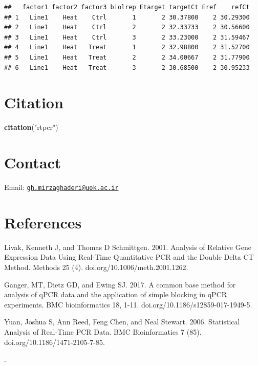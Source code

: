 \documentclass[
]{article}
\newenvironment{Shaded}{\begin{snugshade}}{\end{snugshade}}
\newcommand{\FunctionTok}[1]{\textcolor[rgb]{0.13,0.29,0.53}{\textbf{#1}}}
\newcommand{\NormalTok}[1]{#1}
\newcommand{\StringTok}[1]{\textcolor[rgb]{0.31,0.60,0.02}{#1}}
\begin{document}
\begin{verbatim}
##   factor1 factor2 factor3 biolrep Etarget targetCt Eref    refCt
## 1   Line1    Heat    Ctrl       1       2 30.37800    2 30.29300
## 2   Line1    Heat    Ctrl       2       2 32.33733    2 30.56600
## 3   Line1    Heat    Ctrl       3       2 33.23000    2 31.59467
## 4   Line1    Heat   Treat       1       2 32.98800    2 31.52700
## 5   Line1    Heat   Treat       2       2 34.00667    2 31.77900
## 6   Line1    Heat   Treat       3       2 30.68500    2 30.95233
\end{verbatim}

\hypertarget{citation}{%
\section{Citation}\label{citation}}

\begin{Shaded}
\begin{Highlighting}[]
\FunctionTok{citation}\NormalTok{(}\StringTok{"rtpcr"}\NormalTok{)}
\end{Highlighting}
\end{Shaded}

\hypertarget{contact}{%
\section{Contact}\label{contact}}

Email:
\href{mailto:gh.mirzaghaderi@uok.ac.ir}{\nolinkurl{gh.mirzaghaderi@uok.ac.ir}}

\hypertarget{references}{%
\section{References}\label{references}}

Livak, Kenneth J, and Thomas D Schmittgen. 2001. Analysis of Relative
Gene Expression Data Using Real-Time Quantitative PCR and the Double
Delta CT Method. Methods 25 (4). doi.org/10.1006/meth.2001.1262.

Ganger, MT, Dietz GD, and Ewing SJ. 2017. A common base method for
analysis of qPCR data and the application of simple blocking in qPCR
experiments. BMC bioinformatics 18, 1-11.
doi.org/10.1186/s12859-017-1949-5.

Yuan, Joshua S, Ann Reed, Feng Chen, and Neal Stewart. 2006. Statistical
Analysis of Real-Time PCR Data. BMC Bioinformatics 7 (85).
doi.org/10.1186/1471-2105-7-85.

.
\end{document}
